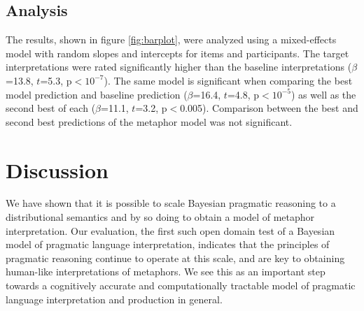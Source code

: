 \documentclass[9pt,twocolumn,twoside,lineno]{pnas-new}
\newcommand{\Listener}{L}
\newcommand{\QLONE}{\Listener_{{1}}^{{Q}}}
\begin{document}
	
	

	\subsection*{Analysis}

		The results, shown in figure \ref{fig:barplot}, were analyzed using a mixed-effects model with random slopes and intercepts for items and participants. The target interpretations were rated significantly higher than the baseline interpretations ($\beta$=13.8, $t$=5.3, p$<10^{-7}$). The same model is significant when comparing the best model prediction and baseline prediction ($\beta$=16.4, $t$=4.8, p$<10^{-5}$) as well as the second best of each ($\beta$=11.1, $t$=3.2, p$<$0.005). Comparison between the best and second best predictions of the metaphor model was not significant.



		

\section{Discussion} \label{conc} 

	We have shown that it is possible to scale Bayesian pragmatic reasoning to a distributional semantics and by so doing to obtain a model of metaphor interpretation. Our evaluation, the first such open domain test of a Bayesian model of pragmatic language interpretation, indicates that the principles of pragmatic reasoning continue to operate at this scale, and are key to obtaining human-like interpretations of metaphors. We see this as an important step towards a cognitively accurate and computationally tractable model of pragmatic language interpretation and production in general.
\end{document}

